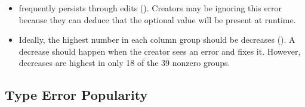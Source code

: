 \documentclass[english,submission,cleveref]{programming}
\begin{document}
\begin{itemize}
  \item
     frequently persists through edits (\keepsym{}).
    Creators may be ignoring this error because they can deduce that the
    optional value will be present at runtime.

  \item
    Ideally, the highest number in each column group should
    be decreases (\dropsym{}).
    A decrease should happen when the creator sees an error and
    fixes it.
    However, decreases are highest in only 18 of the 39 nonzero groups.




\end{itemize}



\subsection{Type Error Popularity}
\label{s:type-error-count}
\end{document}
